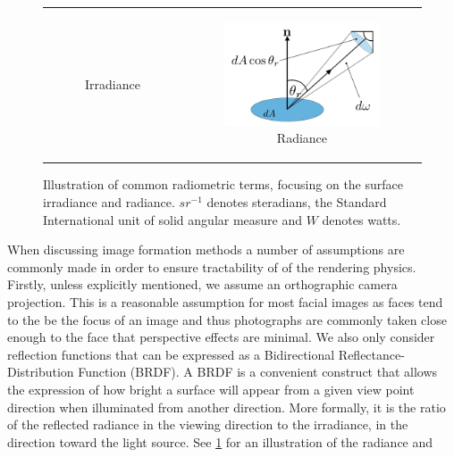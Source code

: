 \begin{figure}
\begin{tabular}{cc}
\begin{subfigure}[b]{0.48\textwidth}
			\caption*{Irradiance}
		\end{subfigure} &
		\begin{subfigure}[b]{0.48\textwidth}
			\centering
			\includegraphics[width=\textwidth]{background/images/radiance}
			\caption*{Radiance}
		\end{subfigure}
	\end{tabular}
	\caption{Illustration of common radiometric terms, focusing on the surface
	         irradiance and radiance. ${sr}^{-1}$ denotes steradians, the
	         Standard International unit of solid angular measure and
	         $W$ denotes watts.}
\label{fig:bg_sfs_rad_irrad}
\end{figure}
When discussing image formation methods a number of assumptions are commonly
made in order to ensure tractability of of the rendering physics. Firstly,
unless explicitly mentioned, we assume an orthographic camera projection. This
is a reasonable assumption for most facial images as faces tend to the be
the focus of an image and thus photographs are commonly taken close enough
to the face that perspective effects are minimal. We also only consider
reflection functions that can be expressed as a Bidirectional
Reflectance-Distribution Function (BRDF). A BRDF is a convenient construct
that allows the expression of how bright a surface will appear from a given
view point direction when illuminated from another direction. More formally, it
is the ratio of the reflected radiance in the viewing direction to the
irradiance, in the direction toward the light source.
See \cref{fig:bg_sfs_rad_irrad} for an illustration of the radiance and
